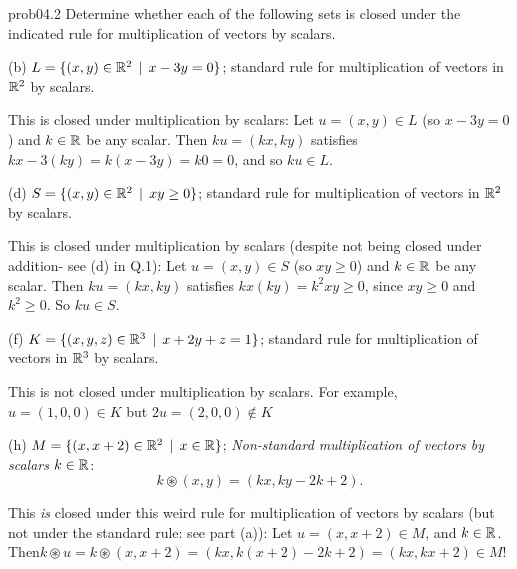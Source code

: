 \begin{sol}{prob04.2} Determine whether each of the following sets is closed under the indicated rule for multiplication of vectors  by scalars.
 
\medskip
 

(b)  $L=\{(x, y) \in \mathbb{R}^2\,\mid \, x -3y=0  \}$;  standard rule for multiplication of vectors  in $\mathbb{R}^2$ by scalars.  

\soln This is closed under multiplication by scalars: Let $u=(x,y)\in L$ (so $x -3y=0$) and $k\in \mathbb{R}$ be any scalar. Then $k u= (kx, ky)$ satisfies $kx-3(ky)=k(x-3y)=k0=0$, and so $ku\in L$.\medskip
%
 

(d)  $S=\{(x, y) \in \mathbb{R}^2\,\mid \, xy \ge 0  \}$; standard rule for multiplication of vectors  in $\mathbb{R}^2$ by scalars. 

\soln This is closed under multiplication by scalars (despite not being closed under addition- see (d) in Q.1): Let $u=(x,y)\in S$ (so $xy \ge 0$) and $k\in \mathbb{R}$ be any scalar. Then $k u= (kx, ky)$ satisfies $kx(ky)=k^2 xy \ge 0$, since  $xy \ge 0$ and $k^2\ge 0$. So $ku\in S$. \medskip
%



(f) $K=\{(x, y, z) \in \mathbb{R}^3\,\mid \, x+2y+z=1  \}$; standard rule for multiplication of vectors  in $\mathbb{R}^3$ by scalars. 

\soln This is not closed under multiplication by scalars. For example, $u=(1,0,0)\in K$ but $2u =(2,0,0)\notin K$\medskip 
%

 

(h)  $M=\{(x, x+2) \in \mathbb{R}^2\,\mid \, x\in \mathbb{R} \}$; {\it Non-standard  multiplication of vectors  by  scalars $k\in \mathbb{R}$}: $$k\circledast (x,y)=(kx, ky-2k+2).$$   


\soln This {\it is} closed under this weird rule for multiplication of vectors  by  scalars (but not under the standard rule: see part (a)): Let $u=(x, x+2)\in M$, and $k\in \mathbb{R}$. Then$k\circledast u =k\circledast (x,x+2)= (kx, k(x+2)-2k+2)=(kx, kx+2) \in M$!
\medskip
  


\end{sol} 

